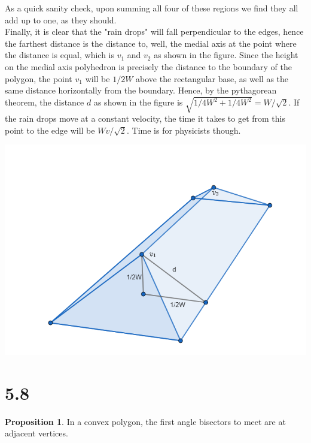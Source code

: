 \documentclass[12pt]{article}
\theoremstyle{definition}
\newtheorem{proposition}{Proposition}
\begin{document}
As a quick sanity check, upon summing all four of these regions we find they all add up to one, as they should.\\

Finally, it is clear that the "rain drops" will fall perpendicular to the edges, hence the farthest distance is the distance to, well, the medial axis at the point where the distance is equal, which is $v_1$ and $v_2$ as shown in the figure. Since the height on the medial axis polyhedron is precisely the distance to the boundary of the polygon, the point $v_1$ will be $1/2W$ above the rectangular base, as well as the same distance horizontally from the boundary. Hence, by the pythagorean theorem, the distance $d$ as shown in the figure is $\sqrt{1/4W^2 + 1/4 W^2} = W/\sqrt{2}$. If the rain drops move at a constant velocity, the time it takes to get from this point to the edge will be $Wv/\sqrt{2}$. Time is for physicists though.

\includegraphics[scale=0.5]{roof.png} 

\section{5.8}
\begin{proposition} In a convex polygon, the first angle bisectors to meet are at adjacent vertices. 
\end{proposition}
\end{document}
